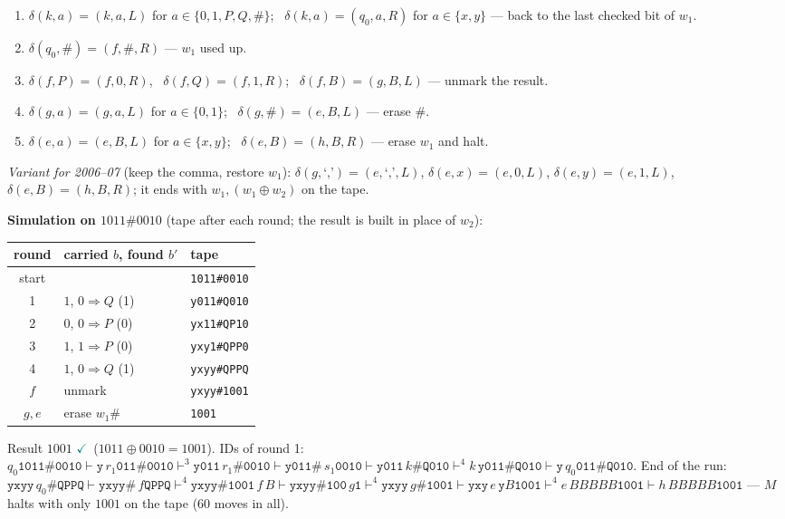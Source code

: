 \documentclass[11pt,a4paper]{article}
\newcommand{\ok}{\textcolor{teal}{\ensuremath{\checkmark}}}
\begin{document}
\begin{solution}
{\begin{enumerate}[label=\arabic*.,itemsep=0pt]
\item $\delta(k,a)=(k,a,L)$ for $a\in\{0,1,P,Q,\#\}$; \ $\delta(k,a)=(q_0,a,R)$ for $a\in\{x,y\}$ --- back to the last checked bit of $w_1$.
\item $\delta(q_0,\#)=(f,\#,R)$ --- $w_1$ used up.
\item $\delta(f,P)=(f,0,R)$, \ $\delta(f,Q)=(f,1,R)$; \ $\delta(f,B)=(g,B,L)$ --- unmark the result.
\item $\delta(g,a)=(g,a,L)$ for $a\in\{0,1\}$; \ $\delta(g,\#)=(e,B,L)$ --- erase $\#$.
\item $\delta(e,a)=(e,B,L)$ for $a\in\{x,y\}$; \ $\delta(e,B)=(h,B,R)$ --- erase $w_1$ and halt.
\end{enumerate}} \emph{Variant for 2006--07} (keep the comma, restore $w_1$): $\delta(g,\text{`,'})=(e,\text{`,'},L)$, $\delta(e,x)=(e,0,L)$, $\delta(e,y)=(e,1,L)$, $\delta(e,B)=(h,B,R)$; it ends with $w_1,(w_1\oplus w_2)$ on the tape.

\textbf{Simulation on $1011\#0010$} (tape after each round; the result is built in place of $w_2$):
\begin{center}\small\begin{tabular}{c|l|l}\toprule round & carried $b$, found $b'$ & tape\\\midrule
start & & \texttt{1011\#0010}\\
1 & $1$, $0\Rightarrow Q$ (1) & \texttt{y011\#Q010}\\
2 & $0$, $0\Rightarrow P$ (0) & \texttt{yx11\#QP10}\\
3 & $1$, $1\Rightarrow P$ (0) & \texttt{yxy1\#QPP0}\\
4 & $1$, $0\Rightarrow Q$ (1) & \texttt{yxyy\#QPPQ}\\
$f$ & unmark & \texttt{yxyy\#1001}\\
$g,e$ & erase $w_1\#$ & \texttt{1001}\\\bottomrule\end{tabular}\end{center}
Result $1001$ \ok\ ($1011\oplus0010=1001$). IDs of round 1: $q_0\texttt{1011\#0010}\vdash\texttt{y}\,r_1\texttt{011\#0010}\vdash^3\texttt{y011}\,r_1\texttt{\#0010}\vdash\texttt{y011\#}\,s_1\texttt{0010}\vdash\texttt{y011}\,k\texttt{\#Q010}\vdash^4k\,\texttt{y011\#Q010}\vdash\texttt{y}\,q_0\texttt{011\#Q010}$. End of the run: $\texttt{yxyy}\,q_0\texttt{\#QPPQ}\vdash\texttt{yxyy\#}\,f\texttt{QPPQ}\vdash^4\texttt{yxyy\#1001}\,f\,B\vdash\texttt{yxyy\#100}\,g\texttt{1}\vdash^4\texttt{yxyy}\,g\texttt{\#1001}\vdash\texttt{yxy}\,e\,\texttt{y}B\texttt{1001}\vdash^4 e\,BBBBB\texttt{1001}\vdash h\,BBBBB\texttt{1001}$ --- $M$ halts with only $1001$ on the tape (60 moves in all).
\end{solution}
\end{document}
